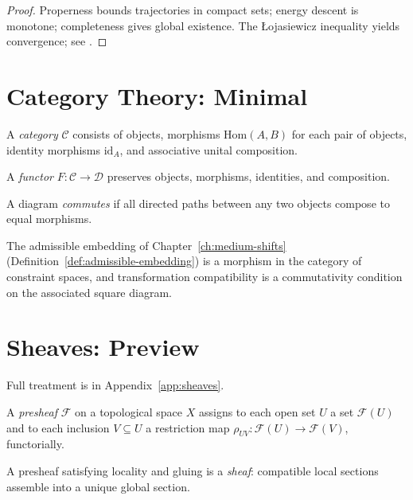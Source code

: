 \documentclass[11pt,openany]{book}
\begin{document}
\begin{proof}
Properness bounds trajectories in compact sets; energy
descent is monotone; completeness gives global existence.
The {\L}ojasiewicz inequality yields convergence;
see \citet{evans2010partial}.
\end{proof}

\section{Category Theory: Minimal}
\label{sec:category-theory}

\begin{definition}[Category]
A \emph{category} $\mathcal{C}$ consists of objects,
morphisms $\mathrm{Hom}(A,B)$ for each pair of objects,
identity morphisms $\mathrm{id}_A$, and associative unital
composition.
\end{definition}

\begin{definition}[Functor]
A \emph{functor} $F : \mathcal{C} \to \mathcal{D}$
preserves objects, morphisms, identities, and composition.
\end{definition}

\begin{definition}
A diagram \emph{commutes} if all directed paths between
any two objects compose to equal morphisms.
\end{definition}

The admissible embedding of Chapter~\ref{ch:medium-shifts}
(Definition~\ref{def:admissible-embedding}) is a morphism
in the category of constraint spaces, and
transformation compatibility is a commutativity condition
on the associated square diagram.

\section{Sheaves: Preview}
\label{sec:sheaves-preview}

Full treatment is in Appendix~\ref{app:sheaves}.

\begin{definition}
A \emph{presheaf} $\mathcal{F}$ on a topological space $X$
assigns to each open set $U$ a set $\mathcal{F}(U)$ and to
each inclusion $V \subseteq U$ a restriction map
$\rho_{UV} : \mathcal{F}(U) \to \mathcal{F}(V)$,
functorially.
\end{definition}

\begin{definition}
A presheaf satisfying locality and gluing is a
\emph{sheaf}: compatible local sections assemble into a
unique global section.
\end{definition}
\end{document}
